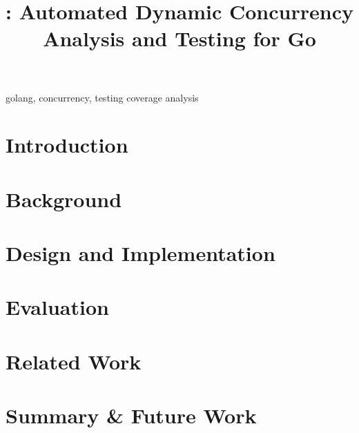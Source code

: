 \documentclass[conference]{IEEEtran}
\begin{document}
\title{\goat: Automated Dynamic Concurrency Analysis and Testing for Go}



\maketitle

\begin{abstract}

\end{abstract}

\begin{IEEEkeywords}
golang, concurrency, testing coverage analysis
\end{IEEEkeywords}


%

\section{Introduction}
\label{sec:intro}



\section{Background}
\label{sec:bg}


\section{Design and Implementation}
\label{sec:design}


\section{Evaluation}
\label{sec:evaluation}


%


\section{Related Work}
\label{sec:related}



\section{Summary \& Future Work}
\label{sec:summary}





\end{document}
